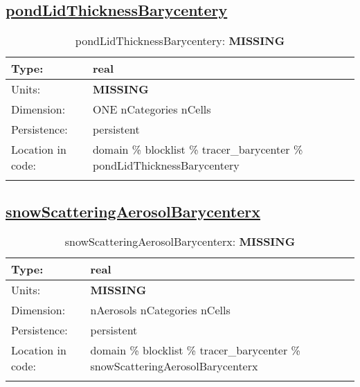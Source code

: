 \subsection[pondLidThicknessBarycentery]{\hyperref[sec:var_tab_tracer_barycenter]{pondLidThicknessBarycentery}}
\label{subsec:var_sec_tracer_barycenter_pondLidThicknessBarycentery}
\begin{center}
\begin{longtable}{| p{2.0in} | p{4.0in} |}
        \hline 
        Type: & real \\
        \hline 
        Units: & {\bf \color{red} MISSING} \\
        \hline 
        Dimension: & ONE nCategories nCells \\
        \hline 
        Persistence: & persistent \\
        \hline 
         Location in code: & domain \% blocklist \% tracer\_barycenter \% pondLidThicknessBarycentery \\
         \hline 
    \caption{pondLidThicknessBarycentery: {\bf \color{red} MISSING}}
\end{longtable}
\end{center}
\subsection[snowScatteringAerosolBarycenterx]{\hyperref[sec:var_tab_tracer_barycenter]{snowScatteringAerosolBarycenterx}}
\label{subsec:var_sec_tracer_barycenter_snowScatteringAerosolBarycenterx}
\begin{center}
\begin{longtable}{| p{2.0in} | p{4.0in} |}
        \hline 
        Type: & real \\
        \hline 
        Units: & {\bf \color{red} MISSING} \\
        \hline 
        Dimension: & nAerosols nCategories nCells \\
        \hline 
        Persistence: & persistent \\
        \hline 
         Location in code: & domain \% blocklist \% tracer\_barycenter \% snowScatteringAerosolBarycenterx \\
         \hline 
    \caption{snowScatteringAerosolBarycenterx: {\bf \color{red} MISSING}}
\end{longtable}
\end{center}
